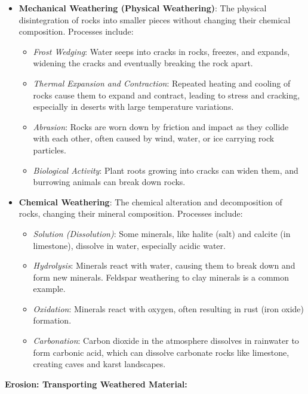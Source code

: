 \begin{itemize}
    \item \textbf{Mechanical Weathering (Physical Weathering)}:  The physical disintegration of rocks into smaller pieces without changing their chemical composition. Processes include:
        \begin{itemize}
            \item \textit{Frost Wedging}: Water seeps into cracks in rocks, freezes, and expands, widening the cracks and eventually breaking the rock apart.
            \item \textit{Thermal Expansion and Contraction}:  Repeated heating and cooling of rocks cause them to expand and contract, leading to stress and cracking, especially in deserts with large temperature variations.
            \item \textit{Abrasion}:  Rocks are worn down by friction and impact as they collide with each other, often caused by wind, water, or ice carrying rock particles.
            \item \textit{Biological Activity}:  Plant roots growing into cracks can widen them, and burrowing animals can break down rocks.
        \end{itemize}
    \item \textbf{Chemical Weathering}:  The chemical alteration and decomposition of rocks, changing their mineral composition. Processes include:
        \begin{itemize}
            \item \textit{Solution (Dissolution)}:  Some minerals, like halite (salt) and calcite (in limestone), dissolve in water, especially acidic water.
            \item \textit{Hydrolysis}:  Minerals react with water, causing them to break down and form new minerals. Feldspar weathering to clay minerals is a common example.
            \item \textit{Oxidation}:  Minerals react with oxygen, often resulting in rust (iron oxide) formation.
            \item \textit{Carbonation}:  Carbon dioxide in the atmosphere dissolves in rainwater to form carbonic acid, which can dissolve carbonate rocks like limestone, creating caves and karst landscapes.
        \end{itemize}
\end{itemize}

\textbf{Erosion: Transporting Weathered Material:}

